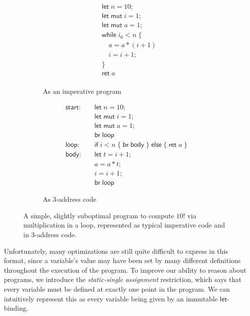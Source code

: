 \documentclass[acmsmall,screen,review]{acmart}
\newcommand{\ms}[1]{\ensuremath{\mathsf{#1}}}
\begin{document}
\begin{figure}
  \begin{subfigure}[t]{.5\textwidth}
    \begin{align*}
      & \ms{let}\;n = 10; \\
      & \ms{let\;mut}\;i = 1; \\
      & \ms{let\;mut}\;a = 1; \\
      & \ms{while}\;i_0 < n\;\{ \\
      & \quad a = a * (i + 1) \\
      & \quad i = i + 1; \\
      & \} \\
      & \ms{ret}\;a \\
    \end{align*}
    \caption{As an imperative program}
    \label{fig:fact-imp}
  \end{subfigure}%
  \begin{subfigure}[t]{.5\textwidth}
    \begin{align*}
      \ms{start}:\quad  & \ms{let}\;n = 10; \\
                        & \ms{let\;mut}\;i = 1; \\
                        & \ms{let\;mut}\;a = 1; \\
                        & \ms{br}\;\ms{loop} \\
      \ms{loop}: \quad  & \ms{if}\;i < n\;
                          \{\;\ms{br}\;\ms{body}\;\}\;
                          \ms{else}\;\{\;\ms{ret}\;a\;\} \\
      \ms{body}: \quad  & \ms{let}\;t = i + 1; \\
                        & a = a * t; \\
                        & i = i + 1; \\
                        & \ms{br}\;\ms{loop}
    \end{align*}
    \caption{As 3-address code}
    \label{fig:fact-3addr}
  \end{subfigure}
  \caption{
    A simple, slightly suboptimal program to compute $10!$ via multiplication in a loop, represented
    as typical imperative code and in 3-address code.
  }
  \Description{}
  \label{fig:fact-program}
\end{figure}

Unfortunately, many optimizations are still quite difficult to express in this format, since a
variable's value may have been set by many different definitions throughout the execution of the
program. To improve our ability to reason about programs, we introduce the \textit{static-single
assignment} restriction, which says that every variable must be defined at exactly one point in the
program. We can intuitively represent this as every variable being given by an immutable
\ms{let}-binding.
\end{document}
